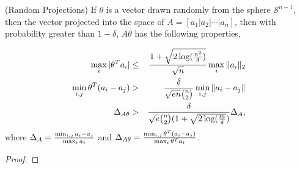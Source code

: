 \begin{proposition}(Random Projections)
  \label{prop:proj}
  If $\theta$ is a vector drawn randomly from the sphere
  $\mathcal{S}^{n-1}$, then the vector projected into the space of $A
  = [a_1 | a_2 | \cdots | a_n]$, then with probability greater than
  $1-\delta$, $A\theta$ has the following properties,

  \begin{eqnarray}
    \max_i |\theta^T a_i| &\le& \frac{1 + \sqrt{2 \log(\frac{n^2}{\delta})}}{\sqrt{n}} \max_i \|a_i\|_2 \\
    \min_{i,j} \theta^T (a_i -a_j)  &>& \frac{\delta}{\sqrt{en} \binom{n}{2}} \min_{i,j} \|a_i - a_j\| \\
    \Delta_{A\theta} &>& \frac{\delta}{\sqrt{e} \binom{n}{2} (1+\sqrt{2\log(\frac{m}{\delta}})} \Delta_{A},
  \end{eqnarray}
  where $\Delta_{A} = \frac{\min_{i,j} a_i - a_j}{\max_i a_i}$ and
    $\Delta_{A\theta} = \frac{\min_{i,j} \theta^T(a_i - a_j)}{\max_i
    \theta^Ta_i}$.
\end{proposition}

\begin{proof}
\end{proof}

